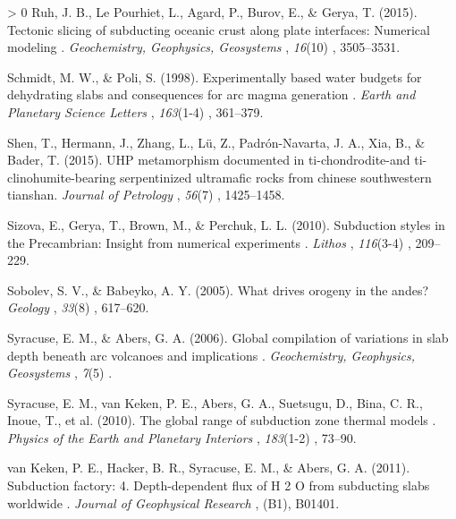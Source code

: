 \documentclass[draft,linenumbers]{agujournal2018} %
\newlength{\cslhangindent} %
\newenvironment{CSLReferences}[3] %
 {%
  \setlength{\parindent}{0pt} %
  \ifodd #1 \everypar{\setlength{\hangindent}{\cslhangindent}}\ignorespaces\fi %
  \ifnum #2 > 0 %
  \setlength{\parskip}{#2\baselineskip} %
  \fi %
 }%
 {} %
\providecommand{\DIFaddtex}[1]{{\protect\color{blue} \sf #1}} %
\providecommand{\DIFadd}[1]{\texorpdfstring{\DIFaddtex{#1}}{#1}} %
\begin{document}
\begin{CSLReferences}{1}{0}
\leavevmode\hypertarget{ref-Ruh2015}{}%
\DIFadd{Ruh, J. B., Le Pourhiet, L., Agard, P., Burov, E., \& Gerya, T. (2015).
}{\DIFadd{Tectonic slicing of subducting oceanic crust along plate interfaces:
Numerical modeling}}\DIFadd{. }\emph{\DIFadd{Geochemistry, Geophysics, Geosystems}}\DIFadd{,
}\emph{16}(10)\DIFadd{, 3505--3531.
}

\leavevmode\hypertarget{ref-Schmidt1998}{}%
\DIFadd{Schmidt, M. W., \& Poli, S. (1998). }{\DIFadd{Experimentally based water budgets
for dehydrating slabs and consequences for arc magma generation}}\DIFadd{.
}\emph{\DIFadd{Earth and Planetary Science Letters}}\DIFadd{, }\emph{163}(1-4)\DIFadd{, 361--379.
}

\leavevmode\hypertarget{ref-Shen2015}{}%
\DIFadd{Shen, T., Hermann, J., Zhang, L., Lü, Z., Padrón-Navarta, J. A., Xia,
B., \& Bader, T. (2015). UHP metamorphism documented in
ti-chondrodite-and ti-clinohumite-bearing serpentinized ultramafic rocks
from chinese southwestern tianshan. }\emph{\DIFadd{Journal of Petrology}}\DIFadd{,
}\emph{56}(7)\DIFadd{, 1425--1458.
}

\leavevmode\hypertarget{ref-Sizova2010}{}%
\DIFadd{Sizova, E., Gerya, T., Brown, M., \& Perchuk, L. L. (2010). }{\DIFadd{Subduction
styles in the Precambrian: Insight from numerical experiments}}\DIFadd{.
}\emph{\DIFadd{Lithos}}\DIFadd{, }\emph{116}(3-4)\DIFadd{, 209--229.
}

\leavevmode\hypertarget{ref-Sobolev2005}{}%
\DIFadd{Sobolev, S. V., \& Babeyko, A. Y. (2005). What drives orogeny in the
andes? }\emph{\DIFadd{Geology}}\DIFadd{, }\emph{33}(8)\DIFadd{, 617--620.
}

\leavevmode\hypertarget{ref-Syracuse2006}{}%
\DIFadd{Syracuse, E. M., \& Abers, G. A. (2006). }{\DIFadd{Global compilation of
variations in slab depth beneath arc volcanoes and implications}}\DIFadd{.
}\emph{\DIFadd{Geochemistry, Geophysics, Geosystems}}\DIFadd{, }\emph{7}(5)\DIFadd{.
}

\leavevmode\hypertarget{ref-Syracuse2010}{}%
\DIFadd{Syracuse, E. M., van Keken, P. E., Abers, G. A., Suetsugu, D., Bina, C.
R., Inoue, T., et al. (2010). }{\DIFadd{The global range of subduction zone
thermal models}}\DIFadd{. }\emph{\DIFadd{Physics of the Earth and Planetary Interiors}}\DIFadd{,
}\emph{183}(1-2)\DIFadd{, 73--90.
}

\leavevmode\hypertarget{ref-VanKeken2011}{}%
\DIFadd{van Keken, P. E., Hacker, B. R., Syracuse, E. M., \& Abers, G. A.
(2011). }{\DIFadd{Subduction factory: 4. Depth-dependent flux of H 2 O from
subducting slabs worldwide}}\DIFadd{. }\emph{\DIFadd{Journal of Geophysical Research}}\DIFadd{,
}\emph{\DIFadd{116}}\DIFadd{(B1), B01401.
}


\end{CSLReferences}
\end{document}
